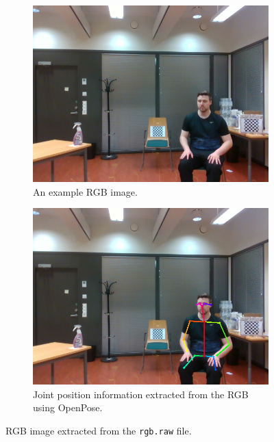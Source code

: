\begin{figure}[H]
    \centering
    \begin{subfigure}[t]{0.49\textwidth}
        \includegraphics[width=\textwidth]{fig/4/rgb-image.png}
        \caption{An example RGB image.}
        \label{fig:rgb-camera-frame}
    \end{subfigure}
    \hfill
    \begin{subfigure}[t]{0.49\textwidth}
        \includegraphics[width=\textwidth]{fig/4/rgb-image-skeleton.png}
        \caption{Joint position information extracted from the RGB using OpenPose\cite{openpose}.}
        \label{fig:rgb-camera-frame-skeleton}
    \end{subfigure}
    \caption{RGB image extracted from the \texttt{rgb.raw} file.}
\end{figure}

